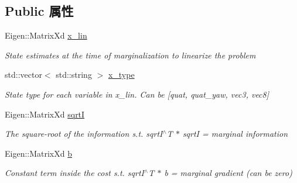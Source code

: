 \subsection*{Public 属性}
\begin{DoxyCompactItemize}
\item 
\mbox{\label{classov__init_1_1Factor__GenericPrior_a11eeaebe7c7e965fde10be9822c858d1}} 
Eigen\+::\+Matrix\+Xd \hyperlink{classov__init_1_1Factor__GenericPrior_a11eeaebe7c7e965fde10be9822c858d1}{x\+\_\+lin}
\begin{DoxyCompactList}\small\item\em State estimates at the time of marginalization to linearize the problem \end{DoxyCompactList}\item 
\mbox{\label{classov__init_1_1Factor__GenericPrior_a9ab293a4952b242f6455d5b5178e5ca1}} 
std\+::vector$<$ std\+::string $>$ \hyperlink{classov__init_1_1Factor__GenericPrior_a9ab293a4952b242f6455d5b5178e5ca1}{x\+\_\+type}
\begin{DoxyCompactList}\small\item\em State type for each variable in x\+\_\+lin. Can be \mbox{[}quat, quat\+\_\+yaw, vec3, vec8\mbox{]} \end{DoxyCompactList}\item 
\mbox{\label{classov__init_1_1Factor__GenericPrior_ac91a3c87710a7a48f5ebb4f32554d3b7}} 
Eigen\+::\+Matrix\+Xd \hyperlink{classov__init_1_1Factor__GenericPrior_ac91a3c87710a7a48f5ebb4f32554d3b7}{sqrtI}
\begin{DoxyCompactList}\small\item\em The square-\/root of the information s.\+t. sqrt\+I$^\wedge$T $\ast$ sqrtI = marginal information \end{DoxyCompactList}\item 
\mbox{\label{classov__init_1_1Factor__GenericPrior_a9a3a5b2873e14ccec67e01a8cd57a755}} 
Eigen\+::\+Matrix\+Xd \hyperlink{classov__init_1_1Factor__GenericPrior_a9a3a5b2873e14ccec67e01a8cd57a755}{b}
\begin{DoxyCompactList}\small\item\em Constant term inside the cost s.\+t. sqrt\+I$^\wedge$T $\ast$ b = marginal gradient (can be zero) \end{DoxyCompactList}\end{DoxyCompactItemize}



